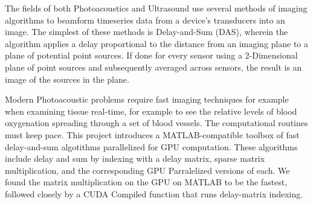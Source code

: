 The fields of both Photoacoustics and Ultrasound use several methods of imaging algorithms to beamform timeseries data from a device's transducers into an image. The simplest of these methods is Delay-and-Sum (DAS), wherein the algorithm applies a delay proportional to the distance from an imaging plane to a plane of potential point sources. If done for every sensor using a 2-Dimensional plane of point sources and subsequently averaged across sensors, the result is an image of the sources in the plane.

Modern Photoacoustic problems require fast imaging techniques for example when examining tissue real-time, for example to see the relative levels of blood oxygenation spreading through a set of blood vessels. The computational routines must keep pace. This project introduces a MATLAB-compatible toolbox of fast delay-and-sum algotithms parallelized for GPU computation. These algorithms include delay and sum by indexing with a delay matrix, sparse matrix multiplication, and the corresponding GPU Parralelized versions of each. We found the matrix multiplication on the GPU on MATLAB to be the fastest, followed closely by a CUDA Compiled function that runs delay-matrix indexing.